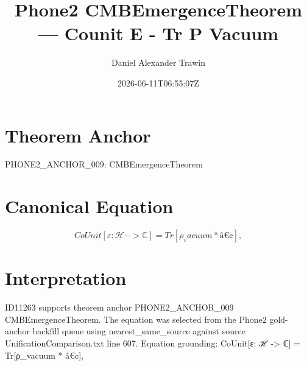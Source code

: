 \documentclass[11pt]{article}
\title{Phone2 CMBEmergenceTheorem — Counit Ε - Tr Ρ Vacuum}
\author{Daniel Alexander Trawin}
\date{2026-06-11T06:55:07Z}
\begin{document}
\maketitle
\section*{Theorem Anchor}
PHONE2_ANCHOR_009: CMBEmergenceTheorem
\section*{Canonical Equation}
\[
CoUnit[ε: ℋ -> ℂ] = Tr[ρ_vacuum * â€¢],
\]
\section*{Interpretation}
ID11263 supports theorem anchor PHONE2_ANCHOR_009 CMBEmergenceTheorem. The equation was selected from the Phone2 gold-anchor backfill queue using nearest_same_source against source UnificationComparison.txt line 607. Equation grounding: CoUnit[ε: ℋ -> ℂ] = Tr[ρ_vacuum * â€¢],
\end{document}
